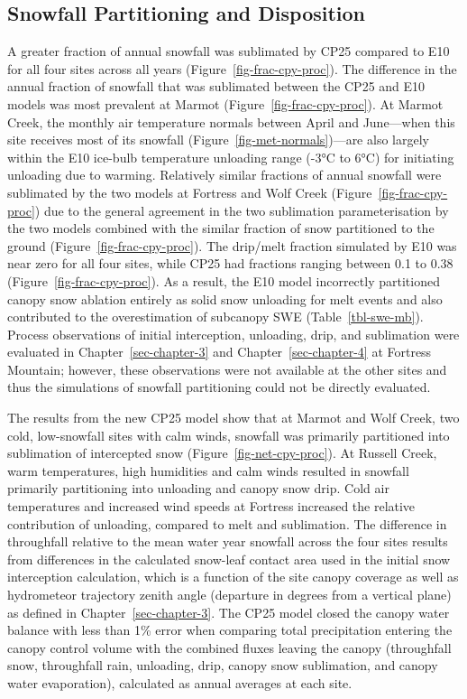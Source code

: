 \documentclass[
  letterpaper,
]{tex/uofsthesis-cs}
\begin{document}
\subsection{Snowfall Partitioning and
Disposition}\label{sec-sf-partition}

A greater fraction of annual snowfall was sublimated by CP25 compared to
E10 for all four sites across all years
(Figure~\ref{fig-frac-cpy-proc}). The difference in the annual fraction
of snowfall that was sublimated between the CP25 and E10 models was most
prevalent at Marmot (Figure~\ref{fig-frac-cpy-proc}). At Marmot Creek,
the monthly air temperature normals between April and June---when this
site receives most of its snowfall (Figure~\ref{fig-met-normals})---are
also largely within the E10 ice-bulb temperature unloading range (-3°C
to 6°C) for initiating unloading due to warming. Relatively similar
fractions of annual snowfall were sublimated by the two models at
Fortress and Wolf Creek (Figure~\ref{fig-frac-cpy-proc}) due to the
general agreement in the two sublimation parameterisation by the two
models combined with the similar fraction of snow partitioned to the
ground (Figure~\ref{fig-frac-cpy-proc}). The drip/melt fraction
simulated by E10 was near zero for all four sites, while CP25 had
fractions ranging between 0.1 to 0.38 (Figure~\ref{fig-frac-cpy-proc}).
As a result, the E10 model incorrectly partitioned canopy snow ablation
entirely as solid snow unloading for melt events and also contributed to
the overestimation of subcanopy SWE (Table~\ref{tbl-swe-mb}). Process
observations of initial interception, unloading, drip, and sublimation
were evaluated in Chapter~\ref{sec-chapter-3} and
Chapter~\ref{sec-chapter-4} at Fortress Mountain; however, these
observations were not available at the other sites and thus the
simulations of snowfall partitioning could not be directly evaluated.

The results from the new CP25 model show that at Marmot and Wolf Creek,
two cold, low-snowfall sites with calm winds, snowfall was primarily
partitioned into sublimation of intercepted snow
(Figure~\ref{fig-net-cpy-proc}). At Russell Creek, warm temperatures,
high humidities and calm winds resulted in snowfall primarily
partitioning into unloading and canopy snow drip. Cold air temperatures
and increased wind speeds at Fortress increased the relative
contribution of unloading, compared to melt and sublimation. The
difference in throughfall relative to the mean water year snowfall
across the four sites results from differences in the calculated
snow-leaf contact area used in the initial snow interception
calculation, which is a function of the site canopy coverage as well as
hydrometeor trajectory zenith angle (departure in degrees from a
vertical plane) as defined in Chapter~\ref{sec-chapter-3}. The CP25
model closed the canopy water balance with less than 1\% error when
comparing total precipitation entering the canopy control volume with
the combined fluxes leaving the canopy (throughfall snow, throughfall
rain, unloading, drip, canopy snow sublimation, and canopy water
evaporation), calculated as annual averages at each site.
\end{document}

